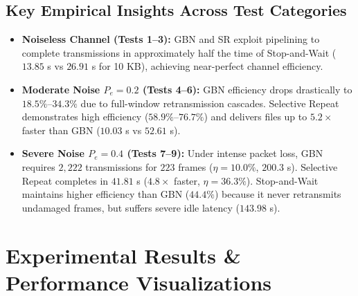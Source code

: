 \documentclass[11pt,a4paper]{article}
\begin{document}
\subsection{Key Empirical Insights Across Test Categories}
\begin{itemize}[leftmargin=1.2em]
    \item \textbf{Noiseless Channel (Tests 1--3):} GBN and SR exploit pipelining to complete transmissions in approximately half the time of Stop-and-Wait ($13.85$ s vs $26.91$ s for 10 KB), achieving near-perfect channel efficiency.
    \item \textbf{Moderate Noise $P_e=0.2$ (Tests 4--6):} GBN efficiency drops drastically to $18.5\%$--$34.3\%$ due to full-window retransmission cascades. Selective Repeat demonstrates high efficiency ($58.9\%$--$76.7\%$) and delivers files up to $5.2\times$ faster than GBN ($10.03$ s vs $52.61$ s).
    \item \textbf{Severe Noise $P_e=0.4$ (Tests 7--9):} Under intense packet loss, GBN requires $2{,}222$ transmissions for $223$ frames ($\eta=10.0\%$, $200.3$ s). Selective Repeat completes in $41.81$ s ($4.8\times$ faster, $\eta=36.3\%$). Stop-and-Wait maintains higher efficiency than GBN ($44.4\%$) because it never retransmits undamaged frames, but suffers severe idle latency ($143.98$ s).
\end{itemize}

\section{Experimental Results \& Performance Visualizations}
\end{document}
